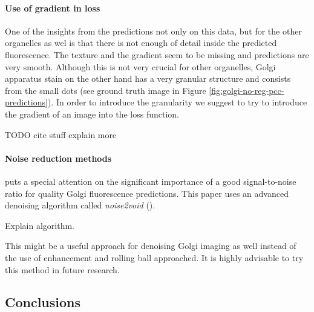         \paragraph{Use of gradient in loss}
            One of the insights from the predictions not only on this data, but for the other organelles as wel is that there is not enough of detail inside the predicted fluorescence. The texture and the gradient seem to be missing and predictions are very smooth. Although this is not very crucial for other organelles, Golgi apparatus stain on the other hand has a very granular structure and consists from the small dots (see ground truth image in Figure \ref{fig:golgi-no-reg-pcc-predictions}). In order to introduce the granularity we suggest to try to introduce the gradient of an image into the loss function. 

            TODO cite stuff explain more
        \paragraph{Noise reduction methods}
            \cite{Cheng_2021} puts a special attention on the significant importance of a good signal-to-noise ratio for quality Golgi fluorescence predictions. This paper uses an advanced denoising algorithm called \textit{noise2void} (\cite{noise2void}). 

            Explain algorithm.

            This might be a useful approach for denoising Golgi imaging as well instead of the use of enhancement and rolling ball approached. It is highly advisable to try this method in future research.

    \subsection{Conclusions}
        